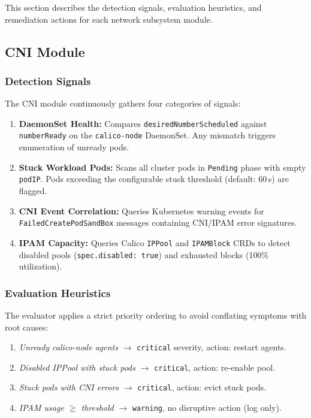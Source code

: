\documentclass[conference]{IEEEtran}
\begin{document}
This section describes the detection signals, evaluation heuristics, and remediation actions for each network subsystem module.

\subsection{CNI Module}

\subsubsection{Detection Signals}
The CNI module continuously gathers four categories of signals:
\begin{enumerate}
  \item \textbf{DaemonSet Health:} Compares \texttt{desiredNumberScheduled} against \texttt{numberReady} on the \texttt{calico-node} DaemonSet. Any mismatch triggers enumeration of unready pods.
  \item \textbf{Stuck Workload Pods:} Scans all cluster pods in \texttt{Pending} phase with empty \texttt{podIP}. Pods exceeding the configurable stuck threshold (default: 60\,s) are flagged.
  \item \textbf{CNI Event Correlation:} Queries Kubernetes warning events for \texttt{FailedCreatePodSandBox} messages containing CNI/IPAM error signatures.
  \item \textbf{IPAM Capacity:} Queries Calico \texttt{IPPool} and \texttt{IPAMBlock} CRDs to detect disabled pools (\texttt{spec.disabled:~true}) and exhausted blocks (100\% utilization).
\end{enumerate}

\subsubsection{Evaluation Heuristics}
The evaluator applies a strict priority ordering to avoid conflating symptoms with root causes:
\begin{enumerate}
  \item \emph{Unready calico-node agents} $\to$ \texttt{critical} severity, action: restart agents.
  \item \emph{Disabled IPPool with stuck pods} $\to$ \texttt{critical}, action: re-enable pool.
  \item \emph{Stuck pods with CNI errors} $\to$ \texttt{critical}, action: evict stuck pods.
  \item \emph{IPAM usage $\geq$ threshold} $\to$ \texttt{warning}, no disruptive action (log only).
\end{enumerate}
\end{document}
